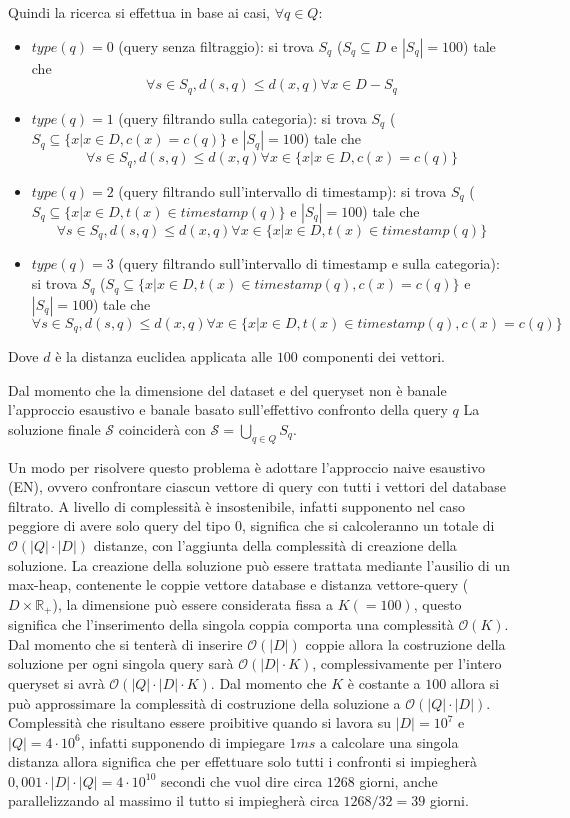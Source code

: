 Quindi la ricerca si effettua in base ai casi, $\forall q\in Q$:
\begin{itemize}
    \item $type(q) = 0$ (query senza filtraggio): si trova $S_q$ ($S_q \subseteq D$ 
    e $|S_q| = 100$) tale che 
    $$\forall s \in S_q, d(s, q) \le d(x, q) \forall x \in D - S_q$$  
    \item $type(q) = 1$ (query filtrando sulla categoria): si trova $S_q$ ($S_q \subseteq \{x| x\in D, c(x) = c(q)\}$ 
    e $|S_q| = 100$) tale che 
    $$\forall s \in S_q, d(s, q) \le d(x, q) \forall x \in \{x| x\in D, c(x) = c(q)\}$$  
    \item $type(q) = 2$ (query filtrando sull'intervallo di timestamp): si trova 
    $S_q$ ($S_q \subseteq \{x| x\in D, t(x) \in timestamp(q)\}$ 
    e $|S_q| = 100$) tale che 
    $$\forall s \in S_q, d(s, q) \le d(x, q) \forall x \in \{x| x\in D, t(x) \in timestamp(q)\}$$  
    \item $type(q) = 3$ (query filtrando sull'intervallo di timestamp e sulla categoria): si trova 
    $S_q$ ($S_q \subseteq \{x| x\in D, t(x) \in timestamp(q),  c(x) = c(q)\}$ 
    e $|S_q| = 100$) tale che 
    $$\forall s \in S_q, d(s, q) \le d(x, q) \forall x \in \{x| x\in D, t(x) \in timestamp(q), c(x) = c(q)\}$$  
\end{itemize}
Dove $d$ è la distanza euclidea applicata alle $100$ componenti dei vettori.

Dal momento che la dimensione del dataset e del queryset non è banale l'approccio
esaustivo e banale basato sull'effettivo confronto della query $q$ 
La soluzione finale $\mathcal{S}$ coinciderà con $ \mathcal{S} = \bigcup_{q\in Q} S_q$.

Un modo per risolvere questo problema è adottare l'approccio naive esaustivo (EN), ovvero 
confrontare ciascun vettore di query con tutti i vettori del database filtrato. 
A livello di complessità è insostenibile, infatti supponento nel caso peggiore 
di avere solo query del tipo $0$, significa che si calcoleranno un totale di 
$\mathcal{O}(|Q| \cdot |D|)$ distanze, con l'aggiunta della complessità di creazione
della soluzione. La creazione della soluzione può essere trattata mediante l'ausilio 
di un max-heap, contenente le coppie vettore database e distanza vettore-query ($D\times \mathbb{R}_+$),
la dimensione può essere considerata fissa a $K(=100)$, questo significa che l'inserimento 
della singola coppia comporta una complessità $\mathcal{O}(K)$. Dal momento che 
si tenterà di inserire $\mathcal{O}(|D|)$ coppie allora la costruzione della 
soluzione per ogni singola query sarà $\mathcal{O}(|D|\cdot K)$, complessivamente per l'intero 
queryset si avrà $\mathcal{O}(|Q| \cdot |D|\cdot K)$. Dal momento che $K$ è costante 
a $100$ allora si può approssimare la complessità di costruzione della soluzione 
a  $\mathcal{O}(|Q| \cdot |D|)$. Complessità che risultano essere proibitive quando 
si lavora su $|D|= 10^7$ e $|Q|= 4\cdot 10^6$, infatti supponendo di impiegare $1ms$ 
a calcolare una singola distanza allora significa che per effettuare solo tutti i 
confronti si impiegherà $0,001 \cdot |D| \cdot |Q| = 4\cdot 10^{10}$
secondi che vuol dire circa $1268$ giorni, anche parallelizzando al massimo 
il tutto si impiegherà circa $1268/32 = 39$ giorni. 

